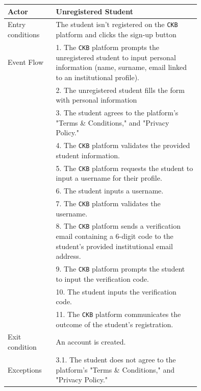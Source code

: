 \begin{center}
    \begin{longtable}{lp{0.75\linewidth}}
        \hline
        Actor            & Unregistered Student                                                                                                                                                                               \\
        \hline
        Entry conditions & The student isn't registered on the \verb|CKB| platform and clicks the sign-up button                                                                                                               \\
        \hline
        Event Flow       
        & 1. The \verb|CKB| platform prompts the unregistered student to input personal information (name, surname, email linked to an institutional profile).\\
        & 2. The unregistered student fills the form with personal information\\
        & 3. The student agrees to the platform's "Terms \& Conditions," and "Privacy Policy."\\
        & 4. The \verb|CKB| platform validates the provided student information.\\
        & 5. The \verb|CKB| platform requests the student to input a username for their profile.\\
        & 6. The student inputs a username.\\ 
        & 7. The \verb|CKB| platform validates the username.\\
        & 8. The \verb|CKB| platform sends a verification email containing a 6-digit code to the student's provided institutional email address.\\
        & 9. The \verb|CKB| platform prompts the student to input the verification code.\\
        & 10. The student inputs the verification code.\\
        & 11. The \verb|CKB| platform communicates the outcome of the student's registration.\\
        \hline
        Exit condition   & An account is created.                                                                                                                                                                              \\
        \hline
        Exceptions       
        & 3.1. The student does not agree to the platform's "Terms \& Conditions," and "Privacy Policy."

\end{longtable}
\end{center}
